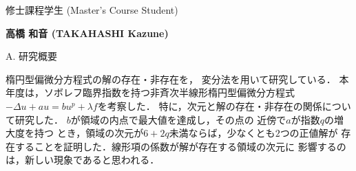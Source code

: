 \documentclass[a4j,twocolumn]{jarticle}
\begin{document}


修士課程学生 (Master's Course Student)



{\bf 高橋 和音 (TAKAHASHI Kazune)}

%
%
%
%


\vspace{0.2cm}
\noindent
A. 研究概要

\vspace{0.1cm}


楕円型偏微分方程式の解の存在・非存在を，
変分法を用いて研究している．
本年度は，ソボレフ臨界指数を持つ非斉次半線形楕円型偏微分方程式
$-\Delta u + a u = b u^p + \lambda f$を考察した．
特に，次元と解の存在・非存在の関係について研究した．
$b$が領域の内点で最大値を達成し，その点の
近傍で$a$が指数$q$の増大度を持つ
とき，領域の次元が$6 + 2q$未満ならば，少なくとも$2$つの正値解が
存在することを証明した．線形項の係数が解が存在する領域の次元に
影響するのは，新しい現象であると思われる．
\end{document}
